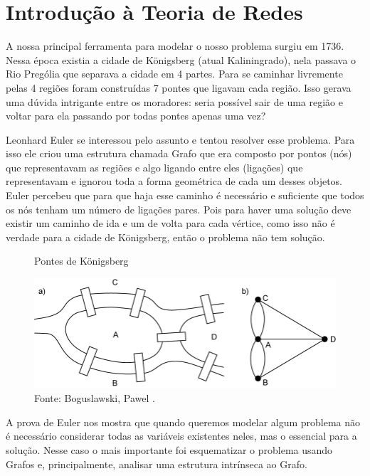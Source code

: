 \documentclass[12pt]{abnt-fisica11}%
\begin{document}
\chapter{Introdução à Teoria de Redes}

A nossa principal ferramenta para modelar o nosso problema surgiu em 1736. Nessa época existia a cidade de Königsberg (atual Kaliningrado), nela passava o Rio Prególia que separava a cidade em 4 partes. Para se caminhar livremente pelas 4 regiões foram construídas 7 pontes que ligavam cada região. Isso gerava uma dúvida intrigante entre os moradores: seria possível sair de uma região e voltar para ela passando por todas pontes apenas uma vez?

Leonhard Euler \cite{Euler1736} se interessou pelo assunto e tentou resolver esse problema. Para isso ele criou uma estrutura chamada Grafo que era composto por pontos (nós) que representavam as regiões e algo ligando entre eles (ligações) que representavam e ignorou toda a forma geométrica de cada um desses objetos. Euler percebeu que para que haja esse caminho é necessário e suficiente que todos os nós tenham um número de ligações pares. Pois para haver uma solução deve existir um caminho de ida e um  de volta para cada vértice, como isso não é verdade para a cidade de Königsberg, então o problema não tem solução.

\begin{figure}[H]
  \centering
  \captionsetup{font=normalsize,skip=1pt,singlelinecheck=on,labelsep=endash}
  \caption{Pontes de Königsberg}
  \includegraphics[scale=0.5]{Koenigsberg.png}
  \captionsetup{font=small,position=below,skip=-1pt}
   \caption*{Fonte: Boguslawski, Pawel \cite{Koenigsberg}.}
   \label{Konigsberg}
\end{figure}

A prova de Euler nos mostra que quando queremos modelar algum problema não é necessário considerar todas as variáveis existentes neles, mas o essencial para a solução. Nesse caso o mais importante foi esquematizar o problema usando Grafos e, principalmente, analisar uma estrutura intrínseca ao Grafo.
\end{document}
